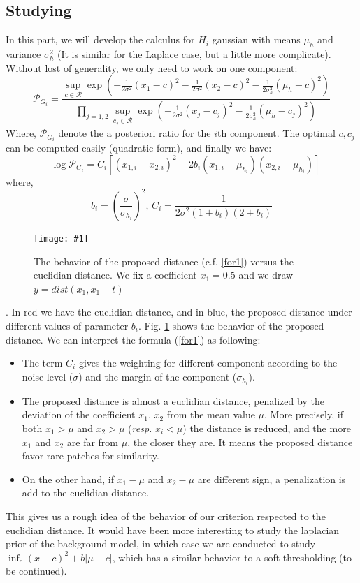 \documentclass[runningheads]{llncs}
\newcommand{\insertF}[4]{
  \begin{figure}[h!]
    \centering
    \begin{minipage}{#3\linewidth}
    \texttt{[image: \#1]}
    \end{minipage}  
      \caption{#2}
      \label{#4}
  \end{figure}  
}
\newcommand{\wdist}[3]{\frac{1}{2#3}(#1-#2 )^2}
\begin{document}
\subsection{Studying}
In this part, we will develop the calculus for $H_i$ gaussian with means $\mu_h$ and variance $\sigma_h^2$ (It is similar for the Laplace case, but a little more complicate). Without lost of generality, we only need to work on one component:
\[
 \mathcal{P}_{G_i} = \frac{\sup_{c\in \mathcal{R}} \exp(-\wdist{x_1}{c}{\sigma^2}-\wdist{x_2}{c}{\sigma^2}-\wdist{\mu_h}{c}{\sigma_h^2}) }
{\prod_{j=1,2}\sup_{c_j\in \mathcal{R}} \exp(-\frac{1}{2\sigma^2}(x_j-c_j )^2-\wdist{\mu_h}{c_j}{\sigma_h^2})  }
\]
Where, $\mathcal{P}_{G_i}$ denote the a posteriori ratio for the $i$th component. The optimal $c, c_j$ can be computed easily (quadratic form), and finally we have:
\begin{equation}
 -\log \mathcal{P}_{G_i}= C_i [ (x_{1,i}-x_{2,i})^2 -2b_i(x_{1,i}-\mu_{h_i})(x_{2,i}-\mu_{h_i})]
 \label{for1}
\end{equation}
where,
\[b_i=(\frac{\sigma}{\sigma_{h_i}})^2\text{, }C_i=\frac{1}{2\sigma^2(1+b_i)(2+b_i)}\]
\insertF{curve}{The behavior of the proposed distance (c.f. \ref{for1}) versus the euclidian distance. We fix a coefficient $x_1=0.5$ and we draw $y=dist(x_1,x_1+t)$}{0.8}{curv}. In red we have the euclidian distance, and in blue, the proposed distance under different values of parameter $b_i$.
Fig. \ref{curv} shows the behavior of the proposed distance. We can interpret the formula (\ref{for1}) as following:
\begin{itemize}
 \item The term $C_i$ gives the weighting for different component according to the noise level ($\sigma$) and the margin of the component ($\sigma_{h_i}$).
 \item The proposed distance is almost a euclidian distance, penalized by the deviation of the coefficient $x_1$, $x_2$ from the mean value $\mu$. More precisely, if both $x_1>\mu$ and $x_2>\mu$ (\textit{resp.} $x_i<\mu$) the distance is reduced, and the more $x_1$ and $x_2$ are far from $\mu$, the closer they are. It means the proposed distance favor rare patches for similarity.
 \item On the other hand, if $x_1-\mu$ and $x_2-\mu$ are different sign, a penalization is add to the euclidian distance. 
\end{itemize}
This gives us a rough idea of the behavior of our criterion respected to the euclidian distance. It would have been more interesting to study the laplacian prior of the background model, in which case we are conducted to study $\inf_c (x-c)^2+b|\mu-c|$, which has a similar behavior to a soft thresholding (to be continued). 
\end{document}
